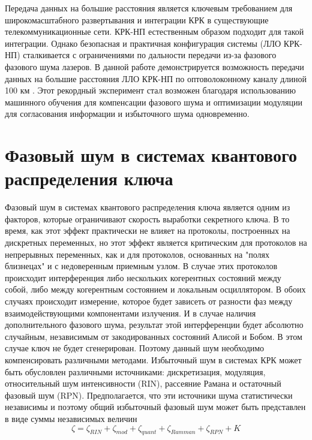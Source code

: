 \newline Передача данных на большие расстояния является ключевым требованием для широкомасштабного развертывания и интеграции КРК в существующие телекоммуникационные сети. КРК-НП естественным образом подходит для такой интеграции. Однако безопасная и практичная конфигурация системы (ЛЛО КРК-НП) сталкивается с ограничениями по дальности передачи из-за фазового
фазового шума лазеров. В данной работе демонстрируется  возможность передачи данных на большие расстояния ЛЛО КРК-НП по оптоволоконному каналу длиной 100 км . Этот рекордный эксперимент стал возможен благодаря использованию машинного обучения для компенсации фазового шума и оптимизации модуляции для согласования информации и избыточного шума одновременно.

\section{Фазовый шум в системах квантового распределения ключа}\label{sec:ch1/sect5}
Фазовый шум в системах квантового распределения ключа является одним из факторов, которые ограничивают скорость выработки секретного ключа. В то время, как этот эффект практически не влияет на протоколы, построенных на дискретных переменных, но этот эффект является критическим для протоколов на непрерывных переменных, как и для протоколов, основанных на "полях близнецах" и с недоверенным приемным узлом. В случае этих протоколов происходит интерференция либо нескольких когерентных состояний между собой, либо между когерентным состоянием и локальным осциллятором. В обоих случаях происходит измерение, которое будет зависеть от разности фаз между взаимодействующими компонентами излучения. И в случае наличия дополнительного фазового шума, результат этой интерференции будет абсолютно случайным, независимым от закодированных состояний Алисой и Бобом. В этом случае ключ не будет сгенерирован. Поэтому данный шум необходимо компенсировать различными методами.
\newline Избыточный шум в системах КРК может быть обусловлен различными источниками: дискретизация, модуляция, относительный шум интенсивности (RIN), рассеяние Рамана и  остаточный фазовый шум (RPN). Предполагается, что эти источники шума статистически независимы и поэтому общий избыточный фазовый шум может быть представлен в виде суммы независимых величин
\begin{equation}
    \zeta = \zeta_{RIN} + \zeta_{mod} + \zeta_{quant} + \zeta_{Ramman} + \zeta_{RPN} + K
\end{equation}\label{eq:noise lit}
